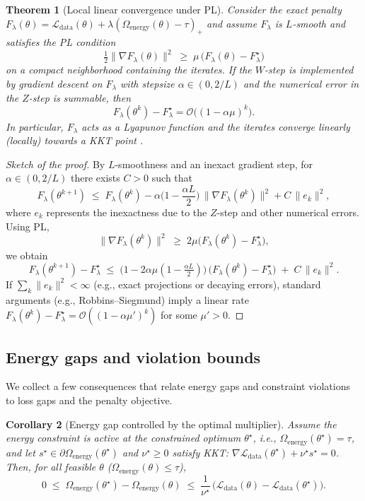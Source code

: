 \documentclass[a4paper,fleqn]{cas-sc}
\newtheorem{theorem}{Theorem}
\newtheorem{corollary}[theorem]{Corollary}
\theoremstyle{remark}
\theoremstyle{definition}
\begin{document}
\begin{theorem}[Local linear convergence under PL]\label{thm:pl}
Consider the exact penalty $F_\lambda(\theta)=\mathcal{L}_{\text{data}}(\theta)+\lambda(\Omega_{\text{energy}}(\theta)-\tau)_+$ and assume $F_\lambda$ is $L$-smooth and satisfies the PL condition
\[
  \tfrac{1}{2}\|\nabla F_\lambda(\theta)\|^2 \;\ge\; \mu\,\big(F_\lambda(\theta)-F_\lambda^\star\big)
\]
on a compact neighborhood containing the iterates. If the $W$-step is implemented by gradient descent on $F_\lambda$ with stepsize $\alpha\in(0,2/L)$ and the numerical error in the $Z$-step is summable, then
\[
F_\lambda(\theta^k)-F_\lambda^\star = \mathcal{O}\big((1-\alpha\mu)^k\big).
\]
In particular, $F_\lambda$ acts as a Lyapunov function and the iterates converge linearly (locally) towards a KKT point \cite{Polyak1963,Nesterov2004,Rockafellar1976AugLag,Attouch2013KL}.
\end{theorem}

\begin{proof}[Sketch of the proof]
By $L$-smoothness and an inexact gradient step, for $\alpha\in(0,2/L)$ there exists $C>0$ such that
\[
  F_\lambda(\theta^{k+1}) 
  \;\le\; F_\lambda(\theta^{k})
  - \alpha\Big(1-\frac{\alpha L}{2}\Big)\,\|\nabla F_\lambda(\theta^{k})\|^2
  + C\,\|e_k\|^2,
\]
where $e_k$ represents the inexactness due to the $Z$-step and other numerical errors. Using PL,
\[
  \|\nabla F_\lambda(\theta^{k})\|^2 \;\ge\; 2\mu\big(F_\lambda(\theta^{k})-F_\lambda^\star\big),
\]
we obtain
\[
  F_\lambda(\theta^{k+1}) - F_\lambda^\star
  \;\le\; \big(1-2\alpha\mu(1-\tfrac{\alpha L}{2})\big)\,\big(F_\lambda(\theta^{k})-F_\lambda^\star\big)
  \;+\; C\,\|e_k\|^2.
\]
If $\sum_k\|e_k\|^2<\infty$ (e.g., exact projections or decaying errors), standard arguments (e.g., Robbins–Siegmund) imply a linear rate $F_\lambda(\theta^{k})-F_\lambda^\star=\mathcal{O}((1-\alpha\mu')^k)$ for some $\mu'>0$.
\end{proof}

\subsection{Energy gaps and violation bounds}

We collect a few consequences that relate energy gaps and constraint violations to loss gaps and the penalty objective.

\begin{corollary}[Energy gap controlled by the optimal multiplier]\label{cor:energy_loss_linear}
Assume the energy constraint is active at the constrained optimum $\theta^\star$, i.e., $\Omega_{\text{energy}}(\theta^\star)=\tau$, and let $s^\star\in \partial \Omega_{\text{energy}}(\theta^\star)$ and $\nu^\star\ge 0$ satisfy KKT:
$\nabla \mathcal{L}_{\text{data}}(\theta^\star)+\nu^\star s^\star=0$. Then, for all feasible $\theta$ ($\Omega_{\text{energy}}(\theta)\le \tau$),
\[
  0 \;\le\; \Omega_{\text{energy}}(\theta^\star)-\Omega_{\text{energy}}(\theta)
  \;\le\; \frac{1}{\nu^\star}\,\big(\mathcal{L}_{\text{data}}(\theta)-\mathcal{L}_{\text{data}}(\theta^\star)\big).
\]
\end{corollary}
\end{document}
